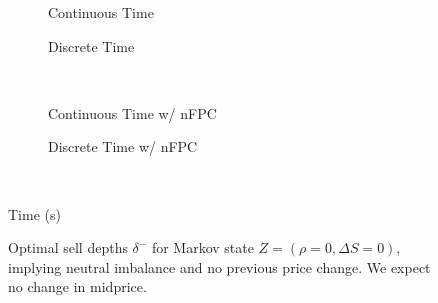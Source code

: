 \begin{figure}%
\centering%
\begin{subfigure}[b]{.4\linewidth}%
  \setlength\figureheight{\linewidth}%
  \setlength\figurewidth{\linewidth}%
  \caption{Continuous Time}%
\end{subfigure}%
\hspace{1.5cm}%
\begin{subfigure}[b]{.4\linewidth}%
  \setlength\figureheight{\linewidth}%
  \setlength\figurewidth{\linewidth}%
  \caption{Discrete Time}%
\end{subfigure}\\%
\vspace{1cm}%
\begin{subfigure}[b]{.4\linewidth}%
  \setlength\figureheight{\linewidth}%
  \setlength\figurewidth{\linewidth}%
  \caption{Continuous Time w/ nFPC}%
\end{subfigure}%
\hspace{1.5cm}%
\begin{subfigure}[b]{.4\linewidth}%
  \setlength\figureheight{\linewidth}%
  \setlength\figurewidth{\linewidth}%
  \caption{Discrete Time w/ nFPC}%
\end{subfigure}\\%
%
\leavevmode{}\hspace{0pt plus 1filll}\null%

Time (s)

\vspace{1cm}%
\begin{subfigure}{\linewidth}%
  \centering%
\end{subfigure}%
  \caption[Optimal sell LO depths for neutral imbalance]{Optimal sell depths $\delta^-$ for Markov state $Z=(\rho = 0, \Delta S = 0)$, implying neutral imbalance and no previous price change. We expect no change in midprice.}\label{fig:comp_dm_z8}%
\end{figure}
